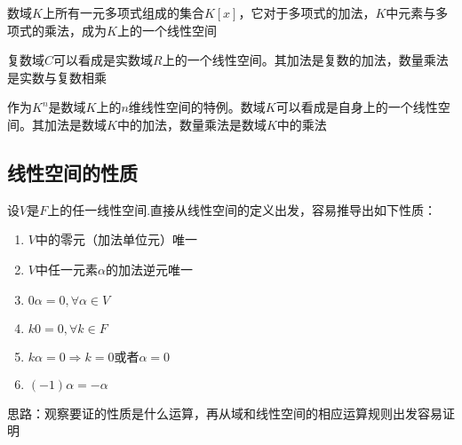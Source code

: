 \begin{example}
    数域$K$上所有一元多项式组成的集合$K[x]$，它对于多项式的加法，$K$中元素与多项式的乘法，成为$K$上的一个线性空间
\end{example}

\begin{example}
    复数域$C$可以看成是实数域$R$上的一个线性空间。其加法是复数的加法，数量乘法是实数与复数相乘
\end{example}

\begin{example}
    作为$K^n$是数域$K$上的$n$维线性空间的特例。数域$K$可以看成是自身上的一个线性空间。其加法是数域$K$中的加法，数量乘法是数域$K$中的乘法
\end{example}

\subsection{线性空间的性质}
设$V$是$F$上的任一线性空间.直接从线性空间的定义出发，容易推导出如下性质：
\begin{enumerate}
    \item $V$中的零元（加法单位元）唯一
    \item $V$中任一元素$\alpha$的加法逆元唯一
    \item $0\alpha = 0, \forall \alpha \in V$
    \item $k0=0, \forall k \in F$
    \item $k\alpha = 0 \Rightarrow k=0 \text{或者} \alpha = 0$
    \item $(-1)\alpha = -\alpha$
\end{enumerate}

\begin{remark}
    思路：观察要证的性质是什么运算，再从域和线性空间的相应运算规则出发容易证明
\end{remark}
